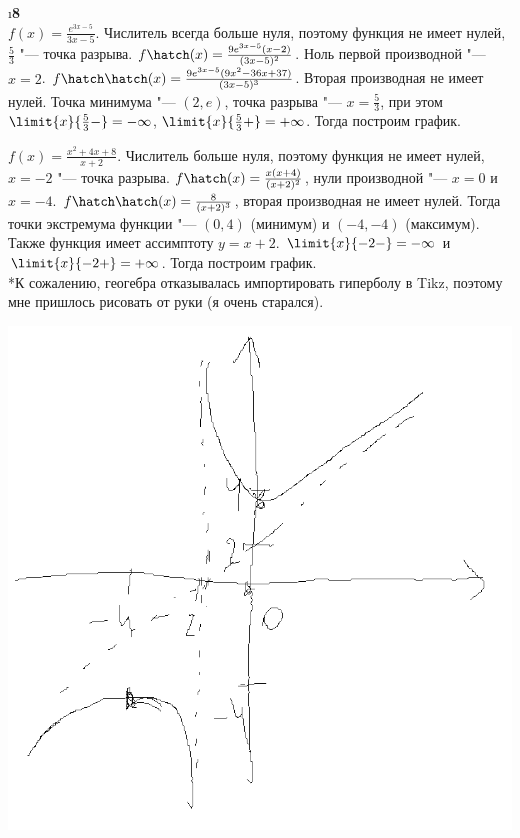 \i\textbf{8}\\
\pu $f(x) = \frac{e^{3x-5}}{3x-5}$. Числитель всегда больше нуля, поэтому функция не имеет нулей, $\frac{5}{3}$ "--- точка разрыва. $f\hatch(x) = \frac{9e^{3x-5}(x-2)}{(3x-5)^2}$. Ноль первой производной "--- $x=2$. $f\hatch\hatch(x) = \frac{9e^{3x-5}(9x^2-36x+37)}{(3x-5)^3}$. Вторая производная не имеет нулей. Точка минимума "--- $(2, e)$, точка разрыва "--- $x=\frac{5}{3}$, при этом $\limit{x}{\frac{5}{3}-}=-\infty$, $\limit{x}{\frac{5}{3}+} = +\infty$. Тогда построим график.



\newpage
\makeFit
\pu $f(x) = \frac{x^2+4x+8}{x+2}$. Числитель больше нуля, поэтому функция не имеет нулей, $x=-2$ "---  точка разрыва. $f\hatch(x) = \frac{x(x+4)}{(x+2)^2}$, нули производной "--- $x = 0$ и $x = -4$. $f\hatch\hatch(x) = \frac{8}{(x+2)^3}$, вторая производная не имеет нулей. Тогда точки экстремума функции "--- $(0, 4)$ (минимум) и $(-4, -4)$ (максимум). Также функция имеет ассимптоту $y = x + 2$. $\limit{x}{-2-} = -\infty$ и $\limit{x}{-2+} = +\infty$. Тогда построим график.\\
*К сожалению, геогебра отказывалась импортировать гиперболу в Tikz, поэтому мне пришлось рисовать от руки (я очень старался).

\includegraphics[scale=0.75]{course1/calculus/homeworks/some data/06.8.b.png}
